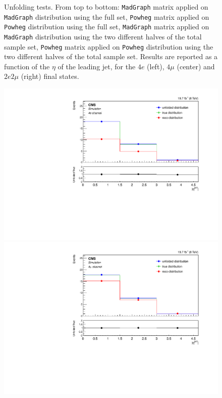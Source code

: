 \begin{figure}[hbtp]
\begin{center}
      \caption{Unfolding tests. From top to bottom: \texttt{MadGraph} matrix applied on \texttt{MadGraph} distribution using the full set, \texttt{Powheg} matrix applied on \texttt{Powheg} distribution using the full set,  \texttt{MadGraph} matrix applied on \texttt{MadGraph} distribution using the two different halves of the total sample set, \texttt{Powheg} matrix applied on \texttt{Powheg} distribution using the two different halves of the total sample set. Results are reported as a function of the $\eta$ of the leading jet, for the $4e$ (left), $4\mu$ (center) and $2e2\mu$ (right) final states.}
    \label{fig:MCtest_EtaJet11}
  \end{center}
\end{figure}

\begin{figure}[hbtp]
  \begin{center}
    \includegraphics[width=0.8\cmsFigWidth]{Figures/Unfolding/MCTests/EtaJet1_ZZTo4e_MadMatrix_PowDistr_FullSample_fr}     
    \includegraphics[width=0.8\cmsFigWidth]{Figures/Unfolding/MCTests/EtaJet1_ZZTo4m_MadMatrix_PowDistr_FullSample_fr}     

\end{center}
\end{figure}
